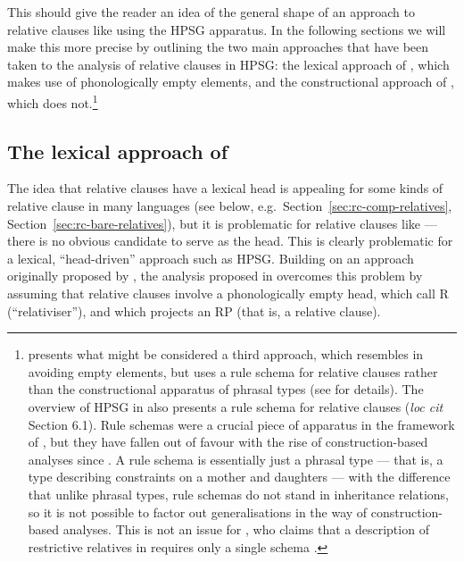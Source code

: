\documentclass[output=paper
                ,modfonts
                ,nonflat
	        ,collection
	        ,collectionchapter
	        ,collectiontoclongg
 	        ,biblatex
                ,babelshorthands
                ,newtxmath
                ,draftmode
                ,colorlinks, citecolor=brown
]{./langsci/langscibook}
\begin{document}
This should give the reader an idea of the general shape of an approach to relative
clauses like  using the HPSG apparatus. In the following sections we will make this
more precise by outlining the two main approaches that have been taken to the analysis of
relative clauses in HPSG: the lexical approach of \cite[Chapter~5]{Pollard:Sag:94}, which
makes use of phonologically empty elements, and the constructional approach of
\cite{Sag:97}, which does not.\footnote{\cite{Mueller99b} presents what might be
  considered a third approach, which resembles \cite{Sag:97} in avoiding empty elements,
  but uses a rule schema for  relative clauses rather than the constructional apparatus
  of phrasal types (see \citealt[95]{Mueller99b} for details). The overview of HPSG in
  \cite{MuellerCurrentApproaches} also presents a rule schema for relative clauses
  (\emph{loc cit} Section 6.1). Rule schemas were a crucial piece of apparatus in the framework of
  \cite{Pollard:Sag:94}, but they have fallen out of favour with the rise of construction-based 
  analyses since \cite{Sag:97}. A rule schema is essentially just a phrasal type ---
  that is, a type describing constraints on a mother and daughters --- with the difference
  that unlike phrasal types, rule schemas do not stand in inheritance relations, so it is
  not possible to factor out generalisations in the way of construction-based
  analyses. This is not an issue for \citeauthor{Mueller99b}, who claims that a
  description of restrictive relatives in  requires only a single schema
  \citep[74]{Mueller99b}.}

\subsection{The lexical approach of }
\label{sec:rc-pollard--sag}

The idea that relative clauses have a lexical head is appealing for some kinds of relative
clause in many languages (see below, e.g.\ Section~\ref{sec:rc-comp-relatives},
Section~\ref{sec:rc-bare-relatives}), but it is problematic for relative clauses like
 --- there is no obvious candidate to serve as the head.  This is clearly
problematic for a lexical, ``head-driven'' approach such as HPSG. Building on an approach originally
proposed by \cite{borsley1989phrase}, the analysis proposed in
\cite[Chapter~5]{Pollard:Sag:94} overcomes this problem by assuming that relative clauses
involve a phonologically empty head, which \citeauthor{Pollard:Sag:94} call R
(``relativiser''), and which projects an RP (that is, a relative clause).
\end{document}
